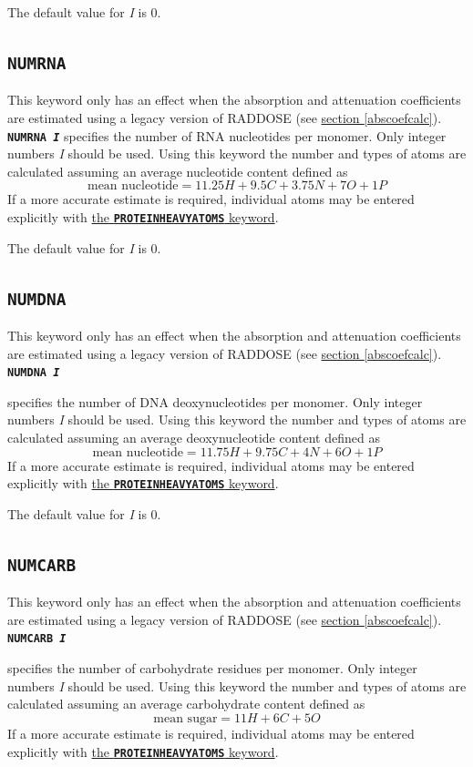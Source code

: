 \documentclass[a4paper]{article}
\newcommand{\Keyword}[1]{\texttt{\textbf{#1}}\xspace}
\newcommand{\SB}{\\[0.2em]}
\newcommand{\RDLegacyKeyword}{This keyword only has an effect when the absorption and attenuation coefficients are estimated using a legacy version of RADDOSE (see \hyperref[abscoefcalc]{section \ref*{abscoefcalc}}).\SB
}
\begin{document}
The default value for \textit{I} is 0.


\subsection{\Keyword{NUMRNA}}
\label{numrna}
\RDLegacyKeyword

\noindent \Keyword{NUMRNA \textit{I}}
specifies the number of RNA nucleotides per monomer. Only integer numbers \textit{I} should be used. Using this keyword the number and types of atoms are calculated assuming an average nucleotide content defined as
\[ \mbox{mean nucleotide} = 11.25H + 9.5C + 3.75N + 7O + 1P \]
If a more accurate estimate is required, individual atoms may be entered explicitly with \hyperref[proteinheavyatoms]{the \Keyword{PROTEINHEAVYATOMS} keyword}.

The default value for \textit{I} is 0.


\subsection{\Keyword{NUMDNA}}
\label{numdna}
\RDLegacyKeyword

\noindent \Keyword{NUMDNA \textit{I}}

specifies the number of DNA deoxynucleotides per monomer. Only integer numbers \textit{I} should be used. Using this keyword the number and types of atoms are calculated assuming an average deoxynucleotide content defined as
\[ \mbox{mean nucleotide} = 11.75H + 9.75C + 4N + 6O + 1P \]
If a more accurate estimate is required, individual atoms may be entered explicitly with \hyperref[proteinheavyatoms]{the \Keyword{PROTEINHEAVYATOMS} keyword}.

The default value for \textit{I} is 0.


\subsection{\Keyword{NUMCARB}}
\label{numcarb}
\RDLegacyKeyword

\noindent \Keyword{NUMCARB \textit{I}}

specifies the number of carbohydrate residues per monomer. Only integer numbers \textit{I} should be used. Using this keyword the number and types of atoms are calculated assuming an average carbohydrate content defined as
\[ \mbox{mean sugar} = 11H + 6C + 5O  \]
If a more accurate estimate is required, individual atoms may be entered explicitly with \hyperref[proteinheavyatoms]{the \Keyword{PROTEINHEAVYATOMS} keyword}.
\end{document}
